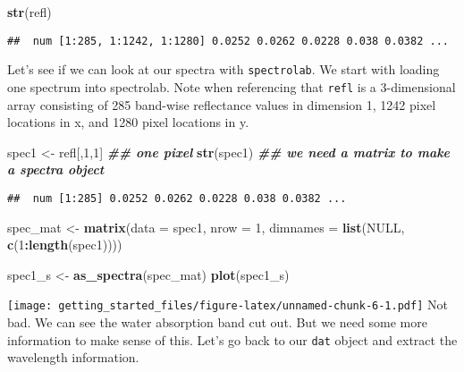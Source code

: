 \documentclass[
]{article}
\newenvironment{Shaded}{\begin{snugshade}}{\end{snugshade}}
\newcommand{\AttributeTok}[1]{\textcolor[rgb]{0.13,0.29,0.53}{#1}}
\newcommand{\ConstantTok}[1]{\textcolor[rgb]{0.56,0.35,0.01}{#1}}
\newcommand{\DecValTok}[1]{\textcolor[rgb]{0.00,0.00,0.81}{#1}}
\newcommand{\DocumentationTok}[1]{\textcolor[rgb]{0.56,0.35,0.01}{\textbf{\textit{#1}}}}
\newcommand{\FunctionTok}[1]{\textcolor[rgb]{0.13,0.29,0.53}{\textbf{#1}}}
\newcommand{\NormalTok}[1]{#1}
\newcommand{\OtherTok}[1]{\textcolor[rgb]{0.56,0.35,0.01}{#1}}
\newcommand{\SpecialCharTok}[1]{\textcolor[rgb]{0.81,0.36,0.00}{\textbf{#1}}}
\begin{document}
\begin{Shaded}
\begin{Highlighting}[]
\FunctionTok{str}\NormalTok{(refl)}
\end{Highlighting}
\end{Shaded}

\begin{verbatim}
##  num [1:285, 1:1242, 1:1280] 0.0252 0.0262 0.0228 0.038 0.0382 ...
\end{verbatim}

Let's see if we can look at our spectra with \texttt{spectrolab}. We
start with loading one spectrum into spectrolab. Note when referencing
that \texttt{refl} is a 3-dimensional array consisting of 285 band-wise
reflectance values in dimension 1, 1242 pixel locations in x, and 1280
pixel locations in y.

\begin{Shaded}
\begin{Highlighting}[]
\NormalTok{spec1 }\OtherTok{\textless{}{-}}\NormalTok{ refl[,}\DecValTok{1}\NormalTok{,}\DecValTok{1}\NormalTok{] }\DocumentationTok{\#\# one pixel}
\FunctionTok{str}\NormalTok{(spec1) }\DocumentationTok{\#\# we need a matrix to make a spectra object}
\end{Highlighting}
\end{Shaded}

\begin{verbatim}
##  num [1:285] 0.0252 0.0262 0.0228 0.038 0.0382 ...
\end{verbatim}

\begin{Shaded}
\begin{Highlighting}[]
\NormalTok{spec\_mat }\OtherTok{\textless{}{-}} \FunctionTok{matrix}\NormalTok{(}\AttributeTok{data =}\NormalTok{ spec1, }\AttributeTok{nrow =} \DecValTok{1}\NormalTok{, }\AttributeTok{dimnames =} \FunctionTok{list}\NormalTok{(}\ConstantTok{NULL}\NormalTok{, }\FunctionTok{c}\NormalTok{(}\DecValTok{1}\SpecialCharTok{:}\FunctionTok{length}\NormalTok{(spec1))))}

\NormalTok{spec1\_s }\OtherTok{\textless{}{-}} \FunctionTok{as\_spectra}\NormalTok{(spec\_mat)}
\FunctionTok{plot}\NormalTok{(spec1\_s)}
\end{Highlighting}
\end{Shaded}

\texttt{[image: getting\_started\_files/figure-latex/unnamed-chunk-6-1.pdf]}
Not bad. We can see the water absorption band cut out. But we need some
more information to make sense of this. Let's go back to our
\texttt{dat} object and extract the wavelength information.
\end{document}
